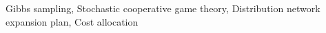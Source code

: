 \documentclass[journal]{IEEEtran} %
\begin{document}






















	
\begin{IEEEkeywords}
Gibbs sampling, Stochastic cooperative game theory, Distribution network expansion plan, Cost allocation
\end{IEEEkeywords}
	
	
	
\end{document}
